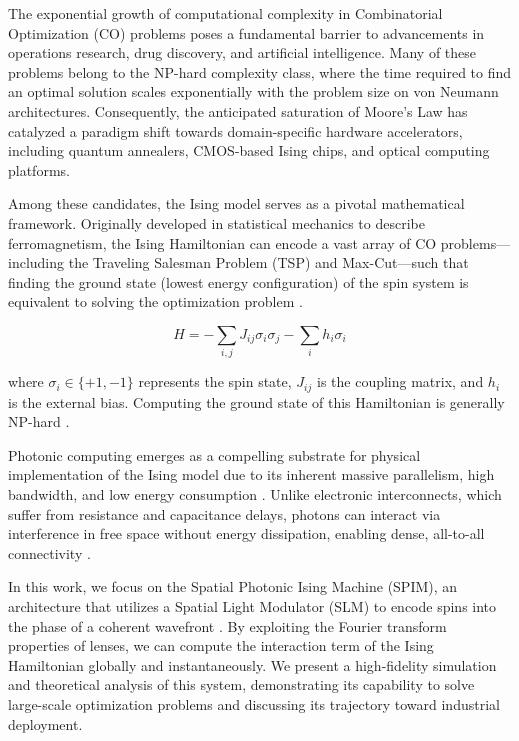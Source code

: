 The exponential growth of computational complexity in Combinatorial Optimization (CO) problems poses a fundamental barrier to advancements in operations research, drug discovery, and artificial intelligence. Many of these problems belong to the NP-hard complexity class, where the time required to find an optimal solution scales exponentially with the problem size on von Neumann architectures. Consequently, the anticipated saturation of Moore's Law has catalyzed a paradigm shift towards domain-specific hardware accelerators, including quantum annealers, CMOS-based Ising chips, and optical computing platforms.

Among these candidates, the Ising model serves as a pivotal mathematical framework. Originally developed in statistical mechanics to describe ferromagnetism, the Ising Hamiltonian can encode a vast array of CO problems—including the Traveling Salesman Problem (TSP) and Max-Cut—such that finding the ground state (lowest energy configuration) of the spin system is equivalent to solving the optimization problem \cite{lucas2014ising}.

$$ H = -\sum_{i,j} J_{ij} \sigma_i \sigma_j - \sum_{i} h_i \sigma_i $$

where $\sigma_i \in \{+1, -1\}$ represents the spin state, $J_{ij}$ is the coupling matrix, and $h_i$ is the external bias. Computing the ground state of this Hamiltonian is generally NP-hard \cite{mohseni2022ising}.

Photonic computing emerges as a compelling substrate for physical implementation of the Ising model due to its inherent massive parallelism, high bandwidth, and low energy consumption \cite{shastri2021photonics}. Unlike electronic interconnects, which suffer from resistance and capacitance delays, photons can interact via interference in free space without energy dissipation, enabling dense, all-to-all connectivity \cite{mcmahon2016fully}.

In this work, we focus on the Spatial Photonic Ising Machine (SPIM), an architecture that utilizes a Spatial Light Modulator (SLM) to encode spins into the phase of a coherent wavefront \cite{pierangeli2019large}. By exploiting the Fourier transform properties of lenses, we can compute the interaction term of the Ising Hamiltonian globally and instantaneously. We present a high-fidelity simulation and theoretical analysis of this system, demonstrating its capability to solve large-scale optimization problems and discussing its trajectory toward industrial deployment.
